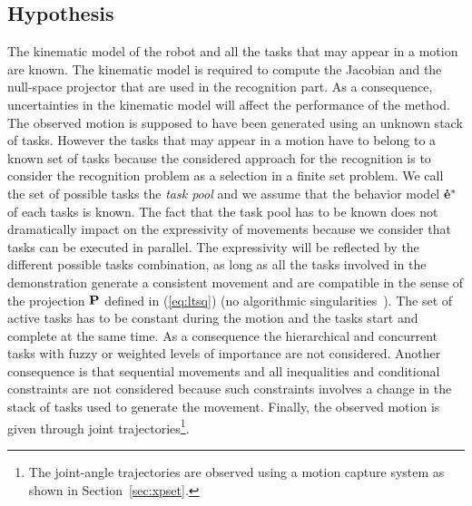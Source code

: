 \documentclass[journal]{IEEEtran}
\begin{document}
\subsection{Hypothesis}
The kinematic model of the robot and all the tasks that may appear in a
motion are known.
The kinematic model is
required to compute the Jacobian and the null-space projector that are used in the recognition part.
As a consequence, uncertainties in the kinematic model will affect the performance of the method.
The observed motion is supposed to have been generated using an unknown stack of tasks.
However the tasks that may appear in a motion have to belong to a known set of tasks because the considered approach
for the recognition is to consider the recognition problem
as a selection in a finite set problem.
We call the set of possible tasks the \emph{task pool} and we assume that the behavior model ${\mathbf{\dot{e}^*}}$ of each tasks is known.
The fact that the task pool has to be known does not dramatically impact on the expressivity
of movements because we consider that tasks can be executed in parallel. The expressivity will
be reflected by the different possible tasks combination, as long as all the tasks involved in the demonstration
generate a consistent movement and are compatible
in the sense of the projection ${\mathbf{P}}$ defined in (\ref{eq:ltsq})
(no algorithmic singularities~\cite{chiaverini97}).
The set of active tasks has to be constant during the motion and the tasks start and complete at the same time.
As a consequence the hierarchical and
concurrent tasks with fuzzy or weighted levels of importance are not considered.
Another consequence is that sequential movements and all inequalities and conditional constraints are not considered because
such constraints involves a change in the stack of tasks used to generate the movement.
Finally, the observed motion is given through
joint trajectories\footnote{The joint-angle trajectories are observed using a motion
capture system as shown in Section~\ref{sec:xpset}.}.
\end{document}
